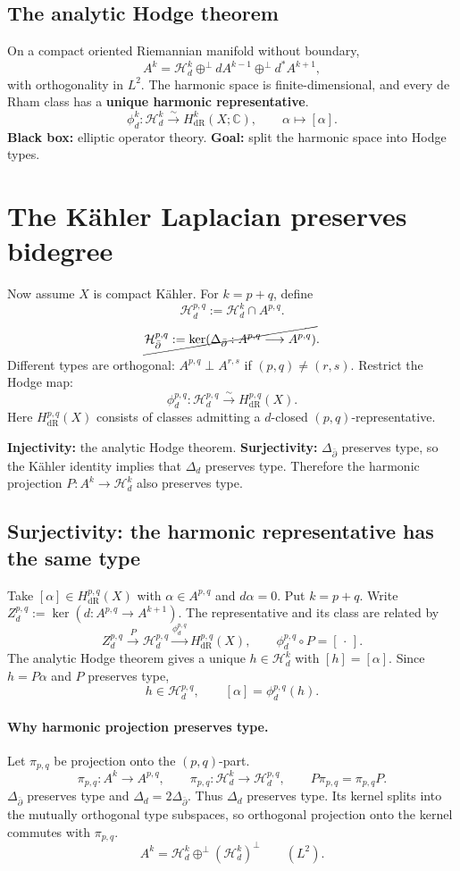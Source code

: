 \documentclass[11pt]{article}
\newcommand{\C}{\mathbb C}
\newcommand{\Hd}{\mathcal H_d}
\newcommand{\dR}{\mathrm{dR}}
\newcommand{\bdel}{\bar\partial}
\newcommand{\orthsum}{\mathbin{\oplus^{\perp}}}
\begin{document}
\subsection*{The analytic Hodge theorem}
On a compact oriented Riemannian manifold without boundary,
\[
 A^k=\Hd^k\orthsum dA^{k-1}\orthsum d^*A^{k+1},
\]
with orthogonality in $L^2$.
The harmonic space is finite-dimensional, and every de Rham class has a
\textbf{unique harmonic representative}.
\[
 \phi_d^k:\Hd^k\xrightarrow{\sim}H^k_{\dR}(X;\C),
 \qquad\alpha\longmapsto[\alpha].
\]
\textbf{Black box:} elliptic operator theory.
\textbf{Goal:} split the harmonic space into Hodge types.

\section*{The K\"ahler Laplacian preserves bidegree}
Now assume $X$ is compact K\"ahler. For $k=p+q$, define
\[
 \Hd^{p,q}:=\Hd^k\cap A^{p,q}.
\]
\[
 \cancel{\mathcal H_{\bdel}^{p,q}
 :=\ker(\Delta_{\bdel}:A^{p,q}\longrightarrow A^{p,q})}.
\]
Different types are orthogonal: $A^{p,q}\perp A^{r,s}$ if
$(p,q)\neq(r,s)$.
Restrict the Hodge map:
\[
 \phi_d^{p,q}:\Hd^{p,q}\xrightarrow{\sim}H^{p,q}_{\dR}(X).
\]
Here $H^{p,q}_{\dR}(X)$ consists of classes admitting a $d$-closed
$(p,q)$-representative.

\textbf{Injectivity:} the analytic Hodge theorem.
\textbf{Surjectivity:} $\Delta_{\bdel}$ preserves type, so the K\"ahler
identity implies that $\Delta_d$ preserves type. Therefore the harmonic
projection $P:A^k\longrightarrow\Hd^k$ also preserves type.

\subsection*{Surjectivity: the harmonic representative has the same type}
Take $[\alpha]\in H^{p,q}_{\dR}(X)$ with $\alpha\in A^{p,q}$ and
$d\alpha=0$. Put $k=p+q$.
Write $Z_d^{p,q}:=\ker(d:A^{p,q}\longrightarrow A^{k+1})$.
The representative and its class are related by
\[
 Z_d^{p,q}\xrightarrow{P}\Hd^{p,q}
 \xrightarrow{\phi_d^{p,q}}H^{p,q}_{\dR}(X),\qquad
 \phi_d^{p,q}\circ P=[\,\cdot\,].
\]
The analytic Hodge theorem gives a unique $h\in\Hd^k$ with
$[h]=[\alpha]$. Since $h=P\alpha$ and $P$ preserves type,
\[
 h\in\Hd^{p,q},\qquad [\alpha]=\phi_d^{p,q}(h).
\]

\paragraph{Why harmonic projection preserves type.}
Let $\pi_{p,q}$ be projection onto the $(p,q)$-part.
\[
 \pi_{p,q}:A^k\longrightarrow A^{p,q},\qquad
 \pi_{p,q}:\Hd^k\longrightarrow\Hd^{p,q},\qquad
 P\pi_{p,q}=\pi_{p,q}P.
\]
$\Delta_{\bdel}$ preserves type and $\Delta_d=2\Delta_{\bdel}$.
Thus $\Delta_d$ preserves type. Its kernel splits into the mutually
orthogonal type subspaces, so orthogonal projection onto the kernel
commutes with $\pi_{p,q}$.
\[
 A^k=\Hd^k\orthsum(\Hd^k)^\perp\qquad(L^2).
\]
\end{document}

